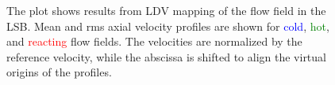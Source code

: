 \begin{figure}

\centering



\caption[Effect of preheat temperature on the LSB flow field - I]{The plot shows results from LDV mapping of the flow field in the LSB. Mean and rms axial velocity profiles are shown for \textcolor{blue}{cold}, \textcolor{green}{hot}, and \textcolor{red}{reacting} flow fields. The velocities are normalized by the reference velocity, while the abscissa is shifted to align the virtual origins of the profiles.}

\label{fig:temperatureLDVResults}

\end{figure}

